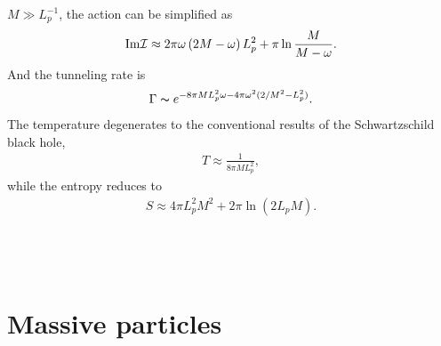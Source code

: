 \documentclass[12pt]{article}
\begin{document}
$M \gg{L_p^{-1}}$, the action can be simplified as
\begin{eqnarray}
{\rm Im}{\cal I} \approx 2\pi \omega \left(2M - \omega \right)L_p^2 +\pi \ln \frac{M}{M-\omega}.
\end{eqnarray}
And the tunneling rate is
\begin{eqnarray}
\Gamma  \thicksim e^{-8\pi M L_p^2 \omega -4 \pi \omega^2(2/M^2-L_p^2) }.
\end{eqnarray}
The temperature degenerates to the conventional results of the Schwartzschild black hole,
\begin{eqnarray}
T \approx \frac{1}{8 \pi M L_p^2  },
\end{eqnarray}
while the entropy reduces to
\begin{eqnarray}
S \approx 4\pi   L_p^2 M^2+ 2 \pi\ln (2 L_p M).
\end{eqnarray}
\\
\\
\\
\section{Massive particles}
\end{document}

